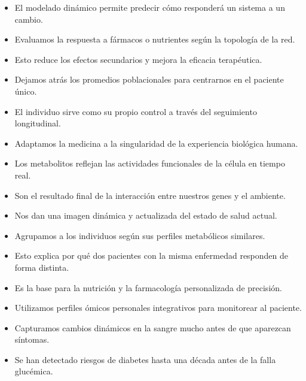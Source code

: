 \begin{itemize}
    \item El modelado dinámico permite predecir cómo responderá un sistema a un cambio.
    \item Evaluamos la respuesta a fármacos o nutrientes según la topología de la red.
    \item Esto reduce los efectos secundarios y mejora la eficacia terapéutica.
\end{itemize}

\begin{itemize}
    \item Dejamos atrás los promedios poblacionales para centrarnos en el paciente único.
    \item El individuo sirve como su propio control a través del seguimiento longitudinal.
    \item Adaptamos la medicina a la singularidad de la experiencia biológica humana.
\end{itemize}

\begin{itemize}
    \item Los metabolitos reflejan las actividades funcionales de la célula en tiempo real.
    \item Son el resultado final de la interacción entre nuestros genes y el ambiente.
    \item Nos dan una imagen dinámica y actualizada del estado de salud actual.
\end{itemize}

\begin{itemize}
    \item Agrupamos a los individuos según sus perfiles metabólicos similares.
    \item Esto explica por qué dos pacientes con la misma enfermedad responden de forma distinta.
    \item Es la base para la nutrición y la farmacología personalizada de precisión.
\end{itemize}

\begin{itemize}
    \item Utilizamos perfiles ómicos personales integrativos para monitorear al paciente.
    \item Capturamos cambios dinámicos en la sangre mucho antes de que aparezcan síntomas.
    \item Se han detectado riesgos de diabetes hasta una década antes de la falla glucémica.
\end{itemize}

